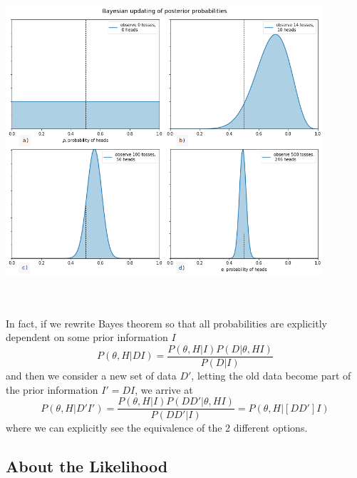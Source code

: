 \documentclass[onecolumn,           %
               showpacs,            %
               preprintnumbers,     %
               aps,                 %
               prl,          	    %
               letterpaper,             %
               superscriptaddress,      %
               nofootinbib,         %
               tightenlines,        %
               floats,floatfix      %
               ,usenatbib,
               ]{revtex4-1}
\begin{document}
\begin{minipage}{\textwidth}
\centering
\includegraphics[height=10cm]{Figures/coin1.png}
\label{coin1}
\end{minipage}
\\$ $ \\

In fact, if we rewrite Bayes theorem so that all probabilities are explicitly dependent on some prior information $I$
\begin{equation}\label{BayesTI}
P(\theta,H|DI)=\frac{P(\theta,H|I)P(D|\theta,HI)}{P(D|I)}
\end{equation}
and then we consider a new set of data $D'$, letting the old data become part of the prior information $I'=DI$, we arrive at \cite{AlanH}   
\begin{equation}
P(\theta,H|D'I')=\frac{P(\theta,H|I)P(DD'|\theta,HI)}{P(DD'|I)}=P(\theta,H|[DD']I)
\end{equation}
where we can explicitly see the equivalence of the 2 different options. 
\subsection{About the Likelihood}
\end{document}
